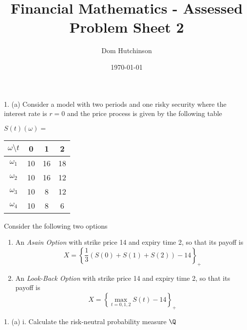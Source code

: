 \documentclass[11pt,a4paper]{article}
\begin{document}
\questionsfalse

\title{Financial Mathematics - Assessed Problem Sheet 2}
\author{Dom Hutchinson}
\date{\today}
\maketitle

\begin{question}{1. (a)}
  Consider a model with two periods and one risky security where the interest rate is $r=0$ and the price process is given by the following table
  \begin{center}
    $S(t)(\omega)=$
    \begin{tabular}{c|ccc}
      $\omega\setminus t$&0&1&2\\\hline
      $\omega_1$&10&16&18\\
      $\omega_2$&10&16&12\\
      $\omega_3$&10&8&12\\
      $\omega_4$&10&8&6
    \end{tabular}
  \end{center}
  Consider the following two options
  \begin{enumerate}
    \item An \textit{Asain Option} with strike price 14 and expiry time 2, so that its payoff is
    \[ X=\left\{\frac13\left(S(0)+S(1)+S(2)\right)-14\right\}_+ \]
    \item An \textit{Look-Back Option} with strike price 14 and expiry time 2, so that its payoff is
    \[ X=\left\{\max_{t=0,1,2}S(t)-14\right\}_+ \]
  \end{enumerate}
\end{question}

\begin{question}{1. (a) i.}
  Calculate the risk-neutral probability measure $\Q$
\end{question}
\end{document}
